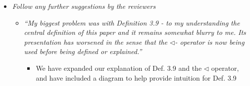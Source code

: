 \documentclass[11pt]{amsart}
\begin{document}
\begin{itemize}
\item
\emph{Follow any further suggestions by the reviewers}
\begin{itemize}
\item
\emph{``My biggest problem was with Definition 3.9 - to my understanding the central definition of this paper and it remains somewhat blurry to me. Its presentation has worsened in the sense that the $\triangleleft$- operator is now being used before being defined or explained.''}
\begin{itemize}
\item
We have expanded our explanation of Def. 3.9 and the $\triangleleft$ operator, and have included a diagram to help provide intuition for Def. 3.9
\end{itemize}
\end{itemize}
\end{itemize}




 
\end{document}
